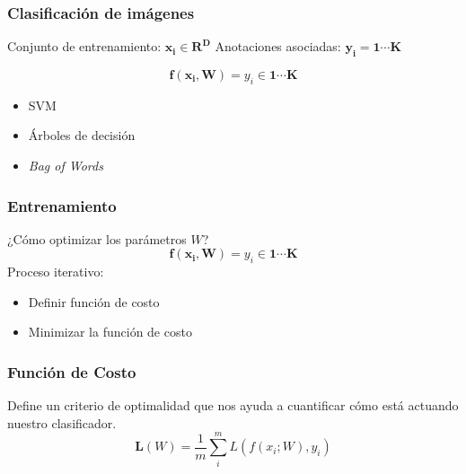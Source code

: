 \documentclass{beamer}
\begin{document}
\begin{frame}[plain]
\frametitle{Clasificación de imágenes}

Conjunto de entrenamiento: \(\boldsymbol{x_i} \in \boldsymbol{R^{D}}\)
Anotaciones asociadas: \(\boldsymbol{y_i = 1\cdots K}\)\vfill

\vfill

\begin{equation}
    \boldsymbol{f(x_i, W)} = y_i \in \boldsymbol{1 \cdots K}
\end{equation}\pause

\vfill

\begin{itemize}
    \item SVM 
    \item Árboles de decisión 
    \item \textit{Bag of Words}
\end{itemize}

\end{frame}




\begin{frame}[plain]
\frametitle{Entrenamiento}
¿Cómo optimizar los parámetros \(W\)?
\vfill
\begin{equation}
    \boldsymbol{f(x_i, W)} = y_i \in \boldsymbol{1 \cdots K}
\end{equation}\pause
\vfill
Proceso iterativo:
\begin{itemize}
    \item Definir función de costo
    \item Minimizar la función de costo
\end{itemize}
\vfill
\end{frame}




\begin{frame}[plain]
\frametitle{Función de Costo}
Define un criterio de optimalidad que nos ayuda a
cuantificar cómo está actuando nuestro clasificador.
\vfill
\begin{equation}
\boldsymbol{L}(W) = \frac{1}{m} \sum^{m}_{i} L(f(x_i;W), y_i)
\end{equation}
\vfill
\end{frame}
\end{document}
